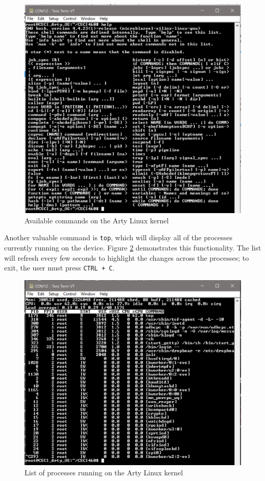 \documentclass{article}
\begin{document}
\begin{figure}[!htb]
	\centering
	\includegraphics [width=\textwidth] {arty_linux_commands.png}
	\caption{Available commands on the Arty Linux kernel}
	\label{fig:commands}
\end{figure} 

Another valuable command is \texttt{top}, which will display all of the processes currently running on the device. Figure \ref{fig:top} demonstrates this functionality. The list will refresh every few seconds to highlight the changes across the processes; to exit, the user must press \texttt{CTRL + C}.\par

\begin{figure}[!htb]
	\centering
	\includegraphics [width=\textwidth] {arty_linux_top.png}
	\caption{List of processes running on the Arty Linux kernel}
	\label{fig:top}
\end{figure} 
\end{document}
